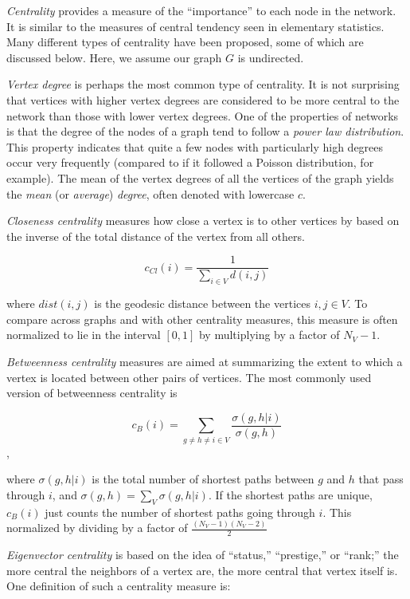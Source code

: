 \documentclass[12pt,twoside]{amherstthesis}
\begin{document}
  \emph{Centrality} provides a measure of the ``importance'' to each node
  in the network. It is similar to the measures of central tendency seen
  in elementary statistics. Many different types of centrality have been
  proposed, some of which are discussed below. Here, we assume our graph
  \(G\) is undirected.
  
  \emph{Vertex degree} is perhaps the most common type of centrality. It
  is not surprising that vertices with higher vertex degrees are
  considered to be more central to the network than those with lower
  vertex degrees. One of the properties of networks is that the degree of
  the nodes of a graph tend to follow a \emph{power law distribution}.
  This property indicates that quite a few nodes with particularly high
  degrees occur very frequently (compared to if it followed a Poisson
  distribution, for example). The mean of the vertex degrees of all the
  vertices of the graph yields the \emph{mean} (or \emph{average})
  \emph{degree}, often denoted with lowercase \(c\).
  
  \emph{Closeness centrality} measures how close a vertex is to other
  vertices by based on the inverse of the total distance of the vertex
  from all others.
  
  \[c_{Cl}(i) = \frac {1} {\sum_{i \in V}^{} d(i, j)}\]
  
  where \(dist(i,j)\) is the geodesic distance between the vertices
  \(i,j \in V\). To compare across graphs and with other centrality
  measures, this measure is often normalized to lie in the interval
  \([0,1]\) by multiplying by a factor of \(N_V - 1\).
  
  \emph{Betweenness centrality} measures are aimed at summarizing the
  extent to which a vertex is located between other pairs of vertices. The
  most commonly used version of betweenness centrality is
  
  \[c_{B}(i) = \sum_{g \neq h \neq i \in V}^{} \frac {\sigma(g,h|i)} {\sigma(g,h)}\],
  
  where \(\sigma(g,h|i)\) is the total number of shortest paths between
  \(g\) and \(h\) that pass through \(i\), and
  \(\sigma(g,h) = \sum_{V}^{} \sigma(g,h|i)\). If the shortest paths are
  unique, \(c_{B}(i)\) just counts the number of shortest paths going
  through \(i\). This normalized by dividing by a factor of
  \(\frac {(N_V - 1)(N_V - 2)} {2}\)
  
  \emph{Eigenvector centrality} is based on the idea of ``status,''
  ``prestige,'' or ``rank;'' the more central the neighbors of a vertex
  are, the more central that vertex itself is. One definition of such a
  centrality measure is:
  
\end{document}
